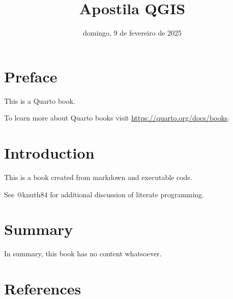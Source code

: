 \documentclass[
  brazilian,
  11pt,
  a4paper,
]{book}
\title{Apostila QGIS}
\author{}
\date{domingo, 9 de fevereiro de 2025}
\renewcommand*\contentsname{Índice}
\newcommand\contentsname{Índice}
\begin{document}
\frontmatter
\maketitle

\renewcommand*\contentsname{Índice}
{
\hypersetup{linkcolor=}
\setcounter{tocdepth}{2}
\tableofcontents
}

\mainmatter
{}

\chapter*{Preface}\label{preface}


This is a Quarto book.

To learn more about Quarto books visit
\url{https://quarto.org/docs/books}.


\chapter{Introduction}\label{introduction}

This is a book created from markdown and executable code.

See @knuth84 for additional discussion of literate programming.


\chapter{Summary}\label{summary}

In summary, this book has no content whatsoever.


\chapter*{References}\label{references}


\label{refs}


\backmatter
\end{document}
